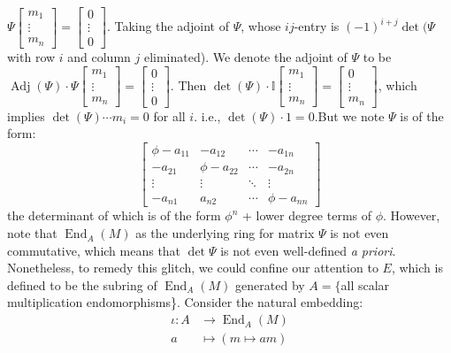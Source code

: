 \documentclass[12pt]{article}
\theoremstyle{definition}
\theoremstyle{plain}
\DeclareMathOperator{\End}{End}
\DeclareMathOperator{\Adj}{Adj}
\begin{document}
$\Psi\begin{bmatrix}
  m_1\\
  \vdots\\
  m_n
\end{bmatrix}=\begin{bmatrix}
  0\\
  \vdots\\
  0
\end{bmatrix}$. Taking the adjoint of $\Psi$, whose $ij$-entry is $(-1)^{i+j}\det(\Psi $with row $i$ and column $j$ eliminated). We denote the adjoint of $\Psi$ to be $\Adj(\Psi)\cdot \Psi\begin{bmatrix}
  m_1\\ \vdots \\m_n
\end{bmatrix}=\begin{bmatrix}
  0\\ \vdots \\0
\end{bmatrix}$. Then $\det(\Psi)\cdot \mathbb{I}\begin{bmatrix}
  m_1\\ \vdots \\m_n
\end{bmatrix}=\begin{bmatrix}
  0\\ \vdots \\m_n
\end{bmatrix}$, which implies $\det (\Psi)\cdots m_i=0$ for all $i$. i.e., $\det(\Psi)\cdot 1=0$.But we note $\Psi$ is of the form:
\begin{equation*}
  \begin{bmatrix}
  \phi-a_{11} & -a_{12} & \cdots & -a_{1n}\\
  -a_{21} & \phi-a_{22} & \cdots & -a_{2n}\\
  \vdots & \vdots &\ddots &\vdots \\
  -a_{n1} & a_{n2} &\cdots &\phi-a_{nn}
\end{bmatrix}
\end{equation*}
the determinant of which is of the form $\phi^n$ + lower degree terms of $\phi$.
\qedhere
\Rmk However, note that $\End_A(M)$ as the underlying ring for matrix $\Psi$ is not even commutative, which means that $\det\Psi$ is not even well-defined \textit{a priori}. Nonetheless, to remedy this glitch, we could confine our attention to $E$, which is defined to be the subring of $\End_A(M)$ generated by $A=\{$all scalar multiplication endomorphisms\}. Consider the natural embedding:
\begin{equation*}
  \begin{split}
    \iota:A&\to \End_A(M)\\
    a&\mapsto (m\mapsto am)
  \end{split}
\end{equation*}
\end{document}
